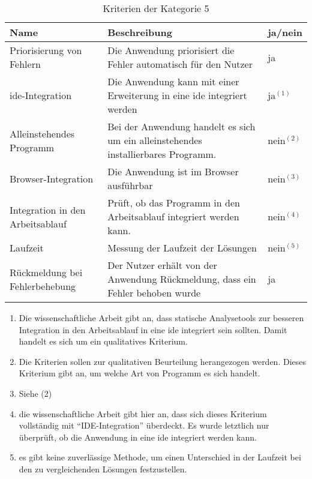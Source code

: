 \begin{table}[t]
    \centering
    \begin{tabularx}{\columnwidth}{XXl}
        \toprule
        \textbf{Name}                    & \textbf{Beschreibung}                                                              & \textbf{ja/nein} \\
        \midrule
        Priorisierung von Fehlern        & Die Anwendung priorisiert die Fehler automatisch für den Nutzer                    & ja               \\
        \midrule
        \ac{ide}-Integration             & Die Anwendung kann mit einer Erweiterung in eine \ac{ide} integriert werden        & ja$^{(1)}$       \\
        \midrule
        Alleinstehendes Programm         & Bei der Anwendung handelt es sich um ein alleinstehendes installierbares Programm. & nein$^{(2)}$     \\
        \midrule
        Browser-Integration              & Die Anwendung ist im Browser ausführbar                                            & nein$^{(3)}$     \\
        \midrule
        Integration in den Arbeitsablauf & Prüft, ob das Programm in den Arbeitsablauf integriert werden kann.                & nein$^{(4)}$     \\
        \midrule
        Laufzeit                         & Messung der Laufzeit der Lösungen                                                  & nein$^{(5)}$     \\
        \midrule
        Rückmeldung bei Fehlerbehebung   & Der Nutzer erhält von der Anwendung Rückmeldung, dass ein Fehler behoben wurde     & ja               \\
        \bottomrule
    \end{tabularx}
    \caption{Kriterien der Kategorie 5}
    \label{tbl:criteria-category-5}
\end{table}

\FloatBarrier

\begin{enumerate}[label= (\arabic*)]
    \item Die wissenschaftliche Arbeit gibt an, dass statische Analysetools zur besseren Integration in den Arbeitsablauf in eine \ac{ide} integriert sein sollten.
          Damit handelt es sich um ein qualitatives Kriterium.
    \item Die Kriterien sollen zur qualitativen Beurteilung herangezogen werden. Dieses Kriterium gibt an, um welche Art von Programm es sich handelt.
    \item Siehe (2)
    \item die wissenschaftliche Arbeit gibt hier an, dass sich dieses Kriterium vollständig mit ``IDE-Integration'' überdeckt. Es wurde letztlich nur überprüft, ob die Anwendung in eine \ac{ide} integriert werden kann.
    \item es gibt keine zuverlässige Methode, um einen Unterschied in der Laufzeit bei den zu vergleichenden Lösungen festzustellen.
\end{enumerate}

